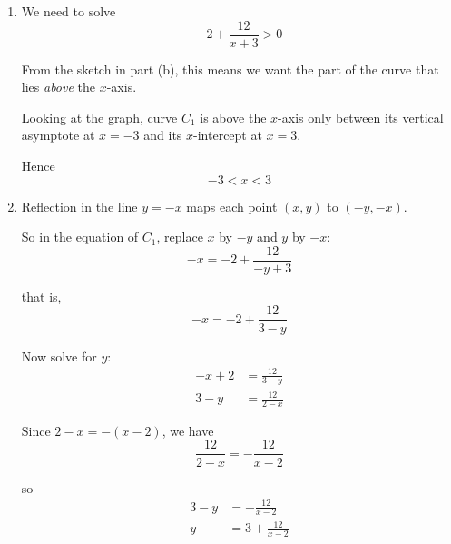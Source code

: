 \documentclass[leqno]{article}
\begin{document}
\begin{enumerate}[
  label=\textbf{\arabic*.},
  leftmargin=*,
  topsep=0pt,
  partopsep=0pt,
  parsep=0pt
]
\begin{djsSolution}
\begin{enumerate}[label=\textbf{(\alph*)}]
  This is a rectangular hyperbola with centre \((-3,-2)\), with asymptotes \(x=-3\) and \(y=-2\).  
  For \(x>-3\), the branch lies above \(y=-2\); for \(x<-3\), the branch lies below \(y=-2\).

  To find the intercepts:

  Setting \(x=0\):
  \[
  y=-2+\frac{12}{0+3}=-2+4=2
  \]

  so the \(y\)-intercept is \((0,2)\).

  Setting \(y=0\):
  \begin{align*}
  -2+\frac{12}{x+3}&=0\\
  -2(x+3)+12&=0\\
  2x&=6\\
  x&=3
  \end{align*}

  so the \(x\)-intercept is \((3,0)\).

  Therefore the intercepts are \((3,0)\) and \((0,2)\).

\item We need to solve
\[
-2+\frac{12}{x+3}>0
\]

From the sketch in part (b), this means we want the part of the curve that lies \emph{above} the $x$-axis.

Looking at the graph, curve $C_1$ is above the $x$-axis only between its vertical asymptote at $x=-3$ and its $x$-intercept at $x=3$.

  Hence
  \[
  -3<x<3
  \]

  \item Reflection in the line \(y=-x\) maps each point \((x,y)\) to \((-y,-x)\).

  So in the equation of \(C_1\), replace \(x\) by \(-y\) and \(y\) by \(-x\):
  \[
  -x=-2+\frac{12}{-y+3}
  \]

  that is,
  \[
  -x=-2+\frac{12}{3-y}
  \]

  Now solve for \(y\):
  \begin{align*}
  -x+2&=\frac{12}{3-y}\\
  3-y&=\frac{12}{2-x}
  \end{align*}

  Since \(2-x=-(x-2)\), we have
  \[
  \frac{12}{2-x}=-\frac{12}{x-2}
  \]

  so
  \begin{align*}
  3-y&=-\frac{12}{x-2}\\
  y&=3+\frac{12}{x-2}
  \end{align*}

\end{enumerate}
\end{djsSolution}



\end{enumerate}
\end{document}
